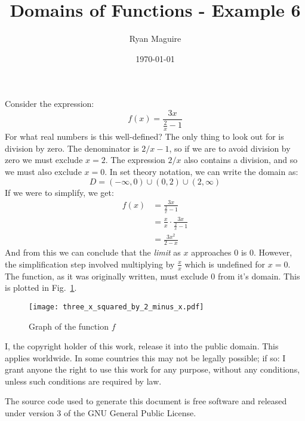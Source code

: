 \documentclass{article}
\title{Domains of Functions - Example 6}
\author{Ryan Maguire}
\date{\today}
\begin{document}
    \maketitle
    Consider the expression:
    \begin{equation}
        f(x)=\frac{3x}{\frac{2}{x}-1}
    \end{equation}
    For what real numbers is this well-defined? The only thing to look out for
    is division by zero. The denominator is $2/x-1$, so if we are to avoid
    division by zero we must exclude $x=2$. The expression $2/x$ also
    contains a division, and so we must also exclude $x=0$. In set theory
    notation, we can write the domain as:
    \begin{equation}
        D=(-\infty,0)\cup(0,2)\cup(2,\infty)
    \end{equation}
    If we were to simplify, we get:
    \begin{align}
        f(x)&=\frac{3x}{\frac{2}{x}-1}\\
            &=\frac{x}{x}\cdot\frac{3x}{\frac{2}{x}-1}\\
            &=\frac{3x^{2}}{2-x}
    \end{align}
    And from this we can conclude that the \textit{limit} as $x$ approaches
    0 is 0. However, the simplification step involved multiplying by
    $\frac{x}{x}$ which is undefined for $x=0$. The function, as it was
    originally written, must exclude 0 from it's domain. This is
    plotted in Fig.~\ref{fig:graph_of_func}.
    \begin{figure}
        \centering
        \texttt{[image: three\_x\_squared\_by\_2\_minus\_x.pdf]}
        \caption{Graph of the function $f$}
        \label{fig:graph_of_func}
    \end{figure}
    \newpage
    I, the copyright holder of this work, release it into the public domain.
    This applies worldwide. In some countries this may not be legally possible;
    if so: I grant anyone the right to use this work for any purpose, without
    any conditions, unless such conditions are required by law.
    \par\hfill\par
    The source code used to generate this document is free software and released
    under version 3 of the GNU General Public License.
\end{document}
